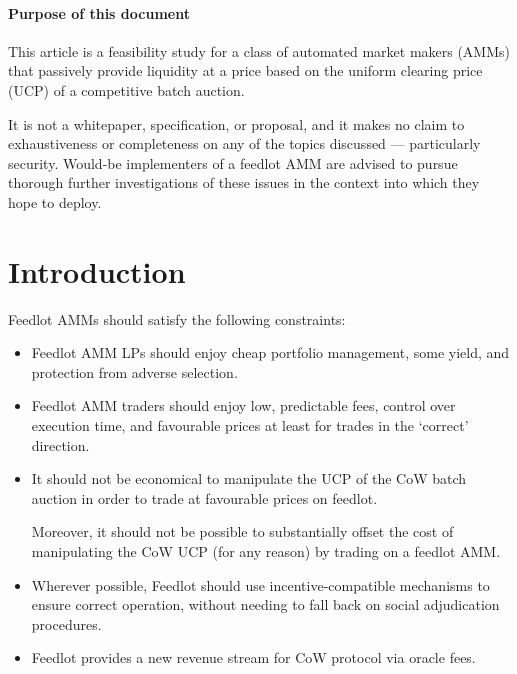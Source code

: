 \documentclass[a4paper,10pt]{article}
\theoremstyle{remark}
\begin{document}
\maketitle
\printsplash

\paragraph{Purpose of this document}

This article is a feasibility study for a class of automated market makers (AMMs) that passively provide liquidity at a price based on the uniform clearing price (UCP) of a competitive batch auction.

It is not a whitepaper, specification, or proposal, and it makes no claim to exhaustiveness or completeness on any of the topics discussed --- particularly security. 
%
Would-be implementers of a feedlot AMM are advised to pursue thorough further investigations of these issues in the context into which they hope to deploy.

\newpage
\section{Introduction}

Feedlot AMMs should satisfy the following constraints:
\begin{itemize}
  \item
    Feedlot AMM LPs should enjoy cheap portfolio management, some yield, and protection from adverse selection.
    
  \item
    Feedlot AMM traders should enjoy low, predictable fees, control over execution time, and favourable prices at least for trades in the `correct' direction.
    
  \item
    It should not be economical to manipulate the UCP of the CoW batch auction in order to trade at favourable prices on feedlot.
    
    Moreover, it should not be possible to substantially offset the cost of manipulating the CoW UCP (for any reason) by trading on a feedlot AMM.

  \item 
    Wherever possible, Feedlot should use incentive-compatible mechanisms to ensure correct operation, without needing to fall back on social adjudication procedures.    
    
  \item
    Feedlot provides a new revenue stream for CoW protocol via oracle fees.
  
\end{itemize}
\end{document}
